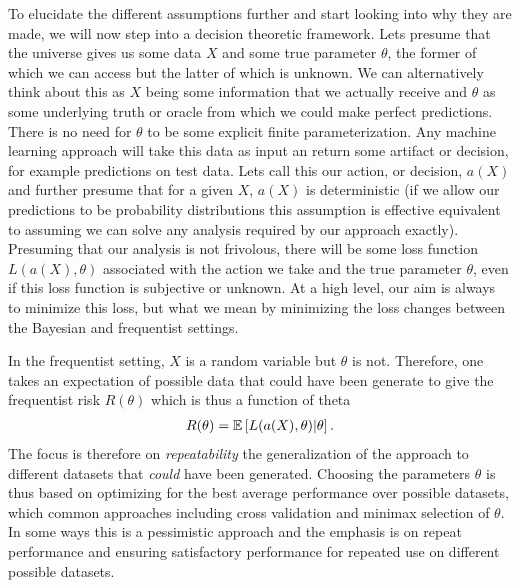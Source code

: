 To elucidate the
different assumptions further and start looking into why they are made, we will now step into a decision theoretic
framework.  Lets presume that the universe gives us some data $X$ and some true parameter $\theta$, the former of which
we can access but the latter of which is unknown.  We can alternatively think about this as $X$ being some information
that we actually receive and $\theta$ as some underlying truth or oracle from which we could make perfect predictions.  There is
no need for $\theta$ to be some explicit finite parameterization.  Any machine learning approach will take this data as input an
return some artifact or decision, for example predictions on test data.  Lets call this our action, or decision, $a(X)$
and further presume that for a given $X$, $a(X)$ is deterministic (if we allow our predictions to be probability
distributions this assumption is effective equivalent to assuming we can solve any analysis required by our approach exactly).
Presuming that our analysis is not frivolous, there will be some loss function $L(a(X),\theta)$ associated with the action we take
and the true parameter $\theta$, even if this loss function is subjective or unknown.  At a high level, our aim is always to
minimize this loss, but what we mean by minimizing the loss changes between the Bayesian and frequentist settings.  

In the
frequentist setting, $X$ is a random variable but $\theta$ is not.  Therefore, one takes an expectation of possible data
that could have been generate to give the frequentist risk $R(\theta)$ which is thus a function of theta~\cite{vapnik1998statistical}
\begin{align}
\label{eq:bayes:freq-risk}
R(\theta)  = \mathbb{E}\left[L(a(X),\theta) | \theta \right].
\end{align}
The focus is therefore on \emph{repeatability}
the generalization of the approach to different datasets that \emph{could} have been generated.
Choosing the parameters $\theta$ is thus based on optimizing for the best average performance over possible datasets,
which common approaches including cross validation and minimax selection of $\theta$.  In some ways this is a pessimistic
approach and the emphasis is on repeat performance and ensuring satisfactory performance for repeated use on different possible
datasets.  

